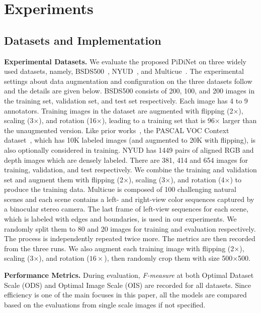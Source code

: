 \documentclass[10pt,twocolumn,letterpaper]{article}
\begin{document}
\section{Experiments}
\label{sec:experiments}

\subsection{Datasets and Implementation}
\noindent \textbf{Experimental Datasets.} \quad We evaluate the proposed PiDiNet on three widely used datasets, namely, BSDS500~\cite{arbelaez2010bsds}, NYUD~\cite{shi2000nyud}, and Multicue~\cite{mely2016multicue}. The experimental settings about data augmentation and configuration on the three datasets follow~\cite{xie2017holistically,liu2019richer,he2019bidirectional} and the details are given below. BSDS500 consists of 200, 100, and 200 images in the training set, validation set, and test set respectively. Each image has 4 to 9 annotators. Training images in the dataset are augmented with flipping (2$\times$), scaling (3$\times$), and rotation (16$\times$), leading to a training set that is 96$\times$ larger than the unaugmented version. Like prior works~\cite{xie2017holistically,liu2019richer,he2019bidirectional}, the PASCAL VOC Context dataset~\cite{mottaghi2014voc}, which has 10K labeled images (and augmented to 20K with flipping), is also optionally considered in training. NYUD has 1449 pairs of aligned RGB and depth images which are densely labeled. There are 381, 414 and 654 images for training, validation, and test respectively. We combine the training and validation set and augment them with flipping (2$\times$), scaling (3$\times$), and rotation (4$\times$) to produce the training data. Multicue is composed of 100 challenging natural scenes and each scene contains a left- and right-view color sequences captured by a binocular stereo camera. The last frame of left-view sequences for each scene, which is labeled with edges and boundaries, is used in our experiments. We randomly split them to 80 and 20 images for training and evaluation respectively. The process is independently repeated twice more. The metrics are then recorded from the three runs. We also augment each training image with flipping (2$\times$), scaling (3$\times$), and rotation ($16\times$), then randomly crop them with size 500$\times$500. 


\vspace{0.3em}
\noindent \textbf{Performance Metrics.} \quad During evaluation, \emph{F-measure} at both Optimal Dataset Scale (ODS) and Optimal Image Scale (OIS) are recorded for all datasets. Since efficiency is one of the main focuses in this paper, all the models are compared based on the evaluations from single scale images if not specified.
\end{document}
